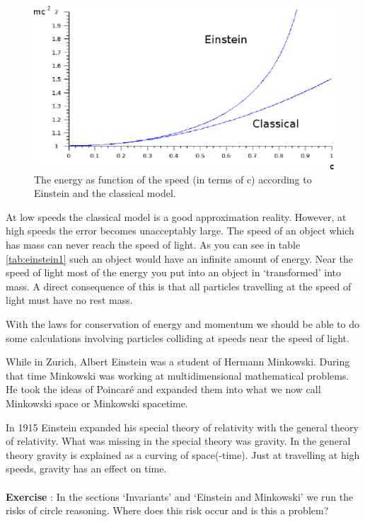 \documentclass[12pt,a4paper]{article}
\numberwithin{equation}{section}
\numberwithin{figure}{section}
\newcounter{Exercise}
\numberwithin{table}{section}
\begin{document}
\begin{figure}\begin{center}
\includegraphics[scale=0.4]{einstein_vs_classical.eps}
\caption{The energy as function of the speed (in terms of c) according to Einstein and the classical model.}\label{fig:einstein_vs_classica}
\end{center}\end{figure}

At low speeds the classical model is a good approximation reality. However, at high speeds the error becomes unacceptably large. The speed of an object which has mass can never reach the speed of light. As you can see in table \ref{tab:einstein1} such an object would have an infinite amount of energy. Near the speed of light most of the energy you put into an object in `transformed' into mass. A direct consequence of this is that all particles travelling at the speed of light must have no rest mass.

With the laws for conservation of energy and momentum we should be able to do some calculations involving particles colliding at speeds near the speed of light.

While in Zurich, Albert Einstein was a student of Hermann Minkowski. During that time Minkowski was working at multidimensional mathematical problems. He took the ideas of Poincar\'e and expanded them into what we now call Minkowski space or Minkowski spacetime.

In 1915 Einstein expanded his special theory of relativity with the general theory of relativity. What was missing in the special theory was gravity. In the general theory gravity is explained as a curving of space(-time). Just at travelling at high speeds, gravity has an effect on time.

\paragraph{} \textbf{Exercise \theExercise {}} : In the sections `Invariants' and `Einstein and Minkowski' we run the risks of circle reasoning. Where does this risk occur and is this a problem?
\end{document}
